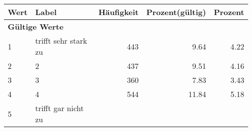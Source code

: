      \begin{longtable}{lXrrr}
     \toprule
     \textbf{Wert} & \textbf{Label} & \textbf{Häufigkeit} & \textbf{Prozent(gültig)} & \textbf{Prozent} \\
     \endhead
     \midrule
     \multicolumn{5}{l}{\textbf{Gültige Werte}}\\

     1 &
     \multicolumn{1}{X}{ trifft sehr stark zu   } &


       \num{443} &
       \num[round-mode=places,round-precision=2]{9.64} &
         \num[round-mode=places,round-precision=2]{4.22} \\

     2 &
     \multicolumn{1}{X}{ 2   } &


       \num{437} &
       \num[round-mode=places,round-precision=2]{9.51} &
         \num[round-mode=places,round-precision=2]{4.16} \\

     3 &
     \multicolumn{1}{X}{ 3   } &


       \num{360} &
       \num[round-mode=places,round-precision=2]{7.83} &
         \num[round-mode=places,round-precision=2]{3.43} \\

     4 &
     \multicolumn{1}{X}{ 4   } &


       \num{544} &
       \num[round-mode=places,round-precision=2]{11.84} &
         \num[round-mode=places,round-precision=2]{5.18} \\

     5 &
     \multicolumn{1}{X}{ trifft gar nicht zu   } &



\end{longtable}
